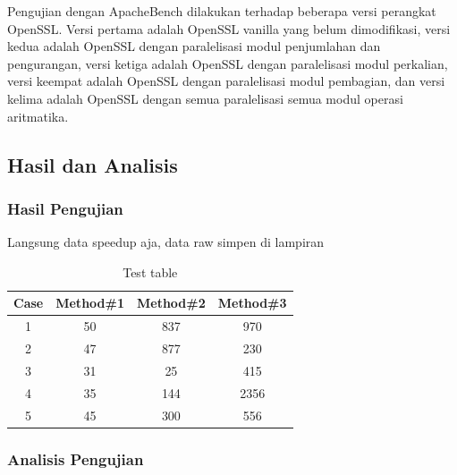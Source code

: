 Pengujian dengan ApacheBench dilakukan terhadap beberapa versi perangkat OpenSSL. Versi pertama adalah OpenSSL vanilla yang belum dimodifikasi, versi kedua adalah OpenSSL dengan paralelisasi modul penjumlahan dan pengurangan, versi ketiga adalah OpenSSL dengan paralelisasi modul perkalian, versi keempat adalah OpenSSL dengan paralelisasi modul pembagian, dan versi kelima adalah OpenSSL dengan semua paralelisasi semua modul operasi aritmatika.

\subsection{Hasil dan Analisis}
\subsubsection{Hasil Pengujian}
  Langsung data speedup aja, data raw simpen di lampiran

  \begin{table}[ht]
  \caption{Test table} %
  \centering %
  \begin{tabular}{c c c c} %
  \hline\hline %
  Case & Method\#1 & Method\#2 & Method\#3 \\ [0.5ex] %
  \hline %
  1 & 50 & 837 & 970 \\ %
  2 & 47 & 877 & 230 \\
  3 & 31 & 25 & 415 \\
  4 & 35 & 144 & 2356 \\
  5 & 45 & 300 & 556 \\ [1ex] %
  \hline %
  \end{tabular}
  \label{table:nonlin} %
  \end{table}

\subsubsection{Analisis Pengujian}

